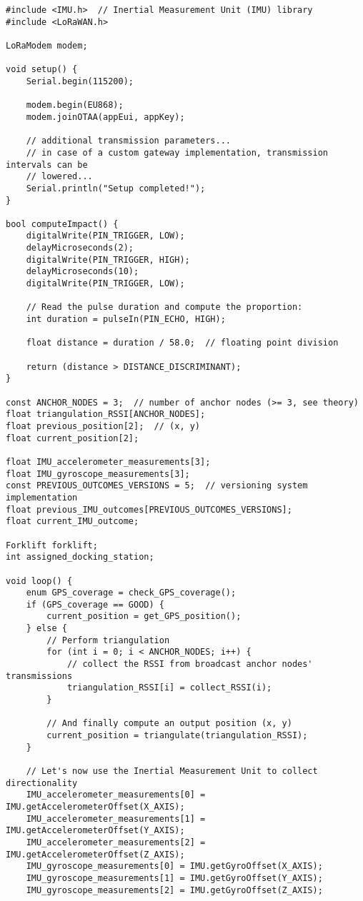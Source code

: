 \documentclass[a4paper,11pt]{article} %
\begin{document}
\begin{verbatim}
#include <IMU.h>  // Inertial Measurement Unit (IMU) library
#include <LoRaWAN.h>

LoRaModem modem;

void setup() {
    Serial.begin(115200);

    modem.begin(EU868);
    modem.joinOTAA(appEui, appKey);

    // additional transmission parameters...
    // in case of a custom gateway implementation, transmission intervals can be
    // lowered...
    Serial.println("Setup completed!");
}

bool computeImpact() {
    digitalWrite(PIN_TRIGGER, LOW);
    delayMicroseconds(2);
    digitalWrite(PIN_TRIGGER, HIGH);
    delayMicroseconds(10);
    digitalWrite(PIN_TRIGGER, LOW);

    // Read the pulse duration and compute the proportion:
    int duration = pulseIn(PIN_ECHO, HIGH);

    float distance = duration / 58.0;  // floating point division

    return (distance > DISTANCE_DISCRIMINANT);
}

const ANCHOR_NODES = 3;  // number of anchor nodes (>= 3, see theory)
float triangulation_RSSI[ANCHOR_NODES];
float previous_position[2];  // (x, y)
float current_position[2];

float IMU_accelerometer_measurements[3];
float IMU_gyroscope_measurements[3];
const PREVIOUS_OUTCOMES_VERSIONS = 5;  // versioning system implementation
float previous_IMU_outcomes[PREVIOUS_OUTCOMES_VERSIONS];
float current_IMU_outcome;

Forklift forklift;
int assigned_docking_station;

void loop() {
    enum GPS_coverage = check_GPS_coverage();
    if (GPS_coverage == GOOD) {
        current_position = get_GPS_position();
    } else {
        // Perform triangulation
        for (int i = 0; i < ANCHOR_NODES; i++) {
            // collect the RSSI from broadcast anchor nodes' transmissions
            triangulation_RSSI[i] = collect_RSSI(i);
        }

        // And finally compute an output position (x, y)
        current_position = triangulate(triangulation_RSSI);
    }

    // Let's now use the Inertial Measurement Unit to collect directionality
    IMU_accelerometer_measurements[0] = IMU.getAccelerometerOffset(X_AXIS);
    IMU_accelerometer_measurements[1] = IMU.getAccelerometerOffset(Y_AXIS);
    IMU_accelerometer_measurements[2] = IMU.getAccelerometerOffset(Z_AXIS);
    IMU_gyroscope_measurements[0] = IMU.getGyroOffset(X_AXIS);
    IMU_gyroscope_measurements[1] = IMU.getGyroOffset(Y_AXIS);
    IMU_gyroscope_measurements[2] = IMU.getGyroOffset(Z_AXIS);


\end{verbatim}
\end{document}
